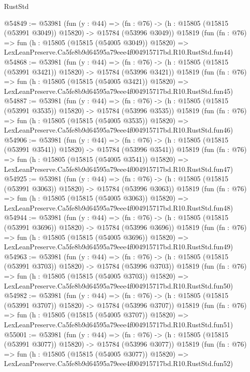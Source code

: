 \begin{lexlean}{RustStd}
\begin{coremodule}
@54849 := @53981
    (fun (y : @44) =>
    (fn : @76) -> (h : @15805 (@15815 (@53991 @3049)) @15820) -> @15784 (@53996 @3049))
    @15819
    (fun (fn : @76) =>
    fun (h : @15805 (@15815 (@54005 @3049)) @15820) =>
    LexLeanPreserve.Ca5fe8b9d64595a79eee4f004915717bd.R10.RustStd.fun44)
@54868 := @53981
    (fun (y : @44) =>
    (fn : @76) -> (h : @15805 (@15815 (@53991 @3421)) @15820) -> @15784 (@53996 @3421))
    @15819
    (fun (fn : @76) =>
    fun (h : @15805 (@15815 (@54005 @3421)) @15820) =>
    LexLeanPreserve.Ca5fe8b9d64595a79eee4f004915717bd.R10.RustStd.fun45)
@54887 := @53981
    (fun (y : @44) =>
    (fn : @76) -> (h : @15805 (@15815 (@53991 @3535)) @15820) -> @15784 (@53996 @3535))
    @15819
    (fun (fn : @76) =>
    fun (h : @15805 (@15815 (@54005 @3535)) @15820) =>
    LexLeanPreserve.Ca5fe8b9d64595a79eee4f004915717bd.R10.RustStd.fun46)
@54906 := @53981
    (fun (y : @44) =>
    (fn : @76) -> (h : @15805 (@15815 (@53991 @3541)) @15820) -> @15784 (@53996 @3541))
    @15819
    (fun (fn : @76) =>
    fun (h : @15805 (@15815 (@54005 @3541)) @15820) =>
    LexLeanPreserve.Ca5fe8b9d64595a79eee4f004915717bd.R10.RustStd.fun47)
@54925 := @53981
    (fun (y : @44) =>
    (fn : @76) -> (h : @15805 (@15815 (@53991 @3063)) @15820) -> @15784 (@53996 @3063))
    @15819
    (fun (fn : @76) =>
    fun (h : @15805 (@15815 (@54005 @3063)) @15820) =>
    LexLeanPreserve.Ca5fe8b9d64595a79eee4f004915717bd.R10.RustStd.fun48)
@54944 := @53981
    (fun (y : @44) =>
    (fn : @76) -> (h : @15805 (@15815 (@53991 @3696)) @15820) -> @15784 (@53996 @3696))
    @15819
    (fun (fn : @76) =>
    fun (h : @15805 (@15815 (@54005 @3696)) @15820) =>
    LexLeanPreserve.Ca5fe8b9d64595a79eee4f004915717bd.R10.RustStd.fun49)
@54963 := @53981
    (fun (y : @44) =>
    (fn : @76) -> (h : @15805 (@15815 (@53991 @3703)) @15820) -> @15784 (@53996 @3703))
    @15819
    (fun (fn : @76) =>
    fun (h : @15805 (@15815 (@54005 @3703)) @15820) =>
    LexLeanPreserve.Ca5fe8b9d64595a79eee4f004915717bd.R10.RustStd.fun50)
@54982 := @53981
    (fun (y : @44) =>
    (fn : @76) -> (h : @15805 (@15815 (@53991 @3707)) @15820) -> @15784 (@53996 @3707))
    @15819
    (fun (fn : @76) =>
    fun (h : @15805 (@15815 (@54005 @3707)) @15820) =>
    LexLeanPreserve.Ca5fe8b9d64595a79eee4f004915717bd.R10.RustStd.fun51)
@55001 := @53981
    (fun (y : @44) =>
    (fn : @76) -> (h : @15805 (@15815 (@53991 @3077)) @15820) -> @15784 (@53996 @3077))
    @15819
    (fun (fn : @76) =>
    fun (h : @15805 (@15815 (@54005 @3077)) @15820) =>
    LexLeanPreserve.Ca5fe8b9d64595a79eee4f004915717bd.R10.RustStd.fun52)

\end{coremodule}
\end{lexlean}
